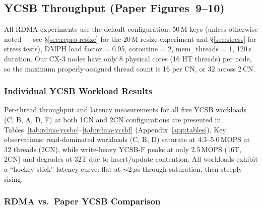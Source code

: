 \documentclass[conference]{IEEEtran}
\begin{document}
\subsection{YCSB Throughput (Paper Figures~9--10)}\label{sec:repro-ycsb}

All RDMA experiments use the default configuration: 50\,M keys (unless otherwise noted --- see \S\ref{sec:repro-resize} for the 20\,M resize experiment and \S\ref{sec:stress} for stress tests), DMPH load factor = 0.95, coroutine = 2, mem\_threads = 1, 120\,s duration. Our CX-3 nodes have only 8 physical cores (16 HT threads) per node, so the maximum properly-assigned thread count is 16 per CN, or 32 across 2\,CN.

\subsubsection{Individual YCSB Workload Results}

Per-thread throughput and latency measurements for all five YCSB workloads (C, B, A, D, F) at both 1CN and 2CN configurations are presented in Tables~\ref{tab:rdma-ycsbc}--\ref{tab:rdma-ycsbf} (Appendix~\ref{app:tables}). Key observations: read-dominated workloads (C, B, D) saturate at 4.3--5.0\,MOPS at 32 threads (2CN), while write-heavy YCSB-F peaks at only 2.5\,MOPS (16T, 2CN) and degrades at 32T due to insert/update contention. All workloads exhibit a ``hockey stick'' latency curve: flat at $\sim$2\,$\mu$s through saturation, then steeply rising.

\subsubsection{RDMA vs.\ Paper YCSB Comparison}
\end{document}
